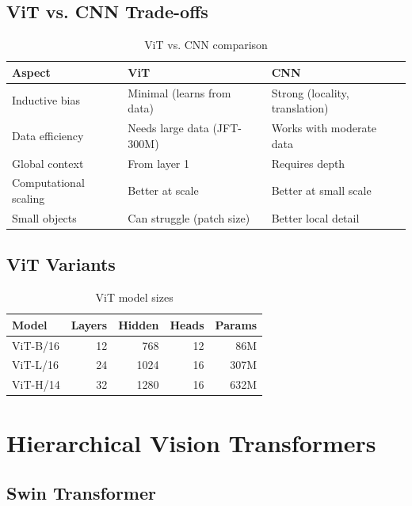 \subsection{ViT vs. CNN Trade-offs}

\begin{table}[H]
\centering
\caption{ViT vs. CNN comparison}
\begin{tabularx}{\textwidth}{lXX}
\toprule
\textbf{Aspect} & \textbf{ViT} & \textbf{CNN} \\
\midrule
Inductive bias & Minimal (learns from data) & Strong (locality, translation) \\
Data efficiency & Needs large data (JFT-300M) & Works with moderate data \\
Global context & From layer 1 & Requires depth \\
Computational scaling & Better at scale & Better at small scale \\
Small objects & Can struggle (patch size) & Better local detail \\
\bottomrule
\end{tabularx}
\end{table}

\subsection{ViT Variants}

\begin{table}[H]
\centering
\caption{ViT model sizes}
\begin{tabular}{lrrrr}
\toprule
\textbf{Model} & \textbf{Layers} & \textbf{Hidden} & \textbf{Heads} & \textbf{Params} \\
\midrule
ViT-B/16 & 12 & 768 & 12 & 86M \\
ViT-L/16 & 24 & 1024 & 16 & 307M \\
ViT-H/14 & 32 & 1280 & 16 & 632M \\
\bottomrule
\end{tabular}
\end{table}

\section{Hierarchical Vision Transformers}
\label{sec:hierarchical_vit}

\subsection{Swin Transformer}

